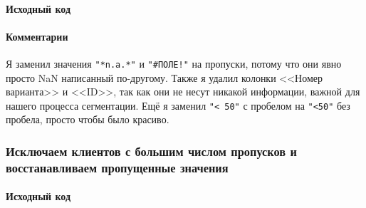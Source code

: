 \documentclass[12pt,a4paper]{article}
\begin{document}
  \paragraph*{Исходный код}
\begin{Shaded}
\begin{Highlighting}[]
\OperatorTok{=}\StringTok{\textquotesingle{}\textless{} 50\textquotesingle{}}\NormalTok{, }\StringTok{\textquotesingle{}\textless{}50\textquotesingle{}}\NormalTok{)}
\end{Highlighting}
\end{Shaded}

\begin{Shaded}
\begin{Highlighting}[]
\OperatorTok{=}\OperatorTok{=}\NormalTok{[}\NormalTok{, }\NormalTok{])}
\end{Highlighting}
\end{Shaded}

  \paragraph*{Комментарии}
  Я заменил значения \texttt{"*n.a.*"} и \texttt{"\#ПОЛЕ!"} на пропуски, потому что они явно просто NaN написанный по-другому.
  Также я удалил колонки <<Номер варианта>> и <<ID>>, так как они не несут никакой информации, важной для нашего процесса сегментации.
  Ещё я заменил \texttt{"{}< 50"} с пробелом на \texttt{"{}<50"} без пробела, просто чтобы было красиво.

  \subsubsection{Исключаем клиентов с большим числом пропусков и восстанавливаем пропущенные значения}
  \paragraph*{Исходный код}
\begin{Shaded}
\begin{Highlighting}[]
\OperatorTok{=}\NormalTok{ data[}\OperatorTok{\textasciitilde{}}\NormalTok{data[cols\_sparse[}\NormalTok{]].isna()]}
\end{Highlighting}
\end{Shaded}
\end{document}
